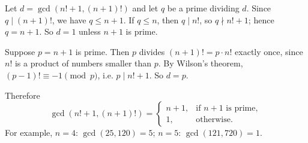 Let $d=\gcd\left(n!+1,(n+1)!\right)$ and let $q$ be a prime dividing $d$. Since $q\mid(n+1)!$, we have $q\le n+1$. If $q\le n$, then $q\mid n!$, so $q\nmid n!+1$; hence $q=n+1$. So $d=1$ unless $n+1$ is prime.

Suppose $p=n+1$ is prime. Then $p$ divides $(n+1)!=p\cdot n!$ exactly once, since $n!$ is a product of numbers smaller than $p$. By Wilson's theorem, $(p-1)!\equiv-1\pmod p$, i.e. $p\mid n!+1$. So $d=p$.

Therefore
\[\gcd\left(n!+1,(n+1)!\right)=\boxed{\begin{cases}n+1,&\text{if }n+1\text{ is prime},\\1,&\text{otherwise.}\end{cases}}\]
For example, $n=4$: $\gcd(25,120)=5$; $n=5$: $\gcd(121,720)=1$.
